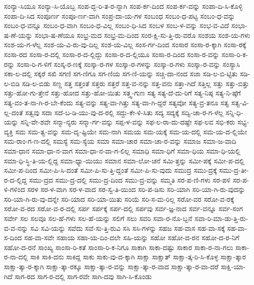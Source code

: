 {ಸಂನ್ಯಾ-ಸಿಯೂ
ಸಂನ್ಯಾ-ಸಿ-ಯೊಬ್ಬ
ಸಂಪ-ದ್ಭ-ರಿ-ತ-ರ-ನ್ನಾಗಿ
ಸಂಪ-ರ್ಕ-ದಿಂದ
ಸಂಪ-ರ್ಕ-ವನ್ನು
ಸಂಪಾ-ದಿ-ಸಿ-ಕೊಳ್ಳಿ
ಸಂಪಾ-ದಿ-ಸಿದ
ಸಂಪೂರ್ಣ
ಸಂಪೂ-ರ್ಣ-ವಾಗಿ
ಸಂಪ್ರ-ದಾ-ಯ-ಗಳ
ಸಂಬಂಧ
ಸಂಬಂ-ಧ-ಪಟ್ಟ
ಸಂಬಂ-ಧ-ವನ್ನು
ಸಂಬಂ-ಧ-ವನ್ನೂ
ಸಂಬಂ-ಧ-ವಾಗಿ
ಸಂಬಂ-ಧ-ವಿಲ್ಲ
ಸಂಬಂ-ಧಿ-ಸಿದ
ಸಂಬಳ
ಸಂಬ-ಳ-ವನ್ನು
ಸಂಭ-ವ-ವಿದೆ
ಸಂಭಾ-ಷ-ಣೆ-ಯನ್ನು
ಸಂಭಾ-ಷ-ಣೆಯೂ
ಸಂಭ್ರ-ಮದ
ಸಂಭ್ರ-ಮ-ದಿಂದ
ಸಂರ-ಕ್ಷಿ-ಸು-ತ್ತಿ-ರು-ವರೊ
ಸಂಶಯ
ಸಂಶ-ಯ-ಗಳು
ಸಂಶ-ಯ-ಗ-ಳೆಲ್ಲ
ಸಂಶ-ಯ-ವಿ-ರು-ವು-ದಿಲ್ಲ
ಸಂಶ-ಯ-ವಿಲ್ಲ
ಸಂಸ-ರ್ಗ-ದಿಂದ
ಸಂಸಾರ
ಸಂಸಾ-ರ-ಕ್ಕಾಗಿ
ಸಂಸಾ-ರಕ್ಕೆ
ಸಂಸಾ-ರದ
ಸಂಸಾ-ರ-ದಲ್ಲಿ
ಸಂಸಾ-ರ-ದ-ಲ್ಲಿದ್ದು
ಸಂಸಾ-ರ-ದ-ಲ್ಲಿಯೂ
ಸಂಸಾ-ರ-ದಿಂದ
ಸಂಸಾ-ರ-ವನ್ನು
ಸಂಸಾ-ರಿ-ಕ-ರನ್ನು
ಸಂಸಾ-ರಿ-ಗ-ಳಿಗೆ
ಸಂಸ್ಕ-ರ-ಣಕ್ಕೆ
ಸಂಸ್ಕಾ-ರ-ಗಳ
ಸಂಸ್ಕಾ-ರ-ಗಳನ್ನು
ಸಂಸ್ಕಾ-ರ-ಗಳು
ಸಂಸ್ಕಾ-ರ-ವನ್ನು
ಸಂಸ್ಯಾಸಿ
ಸಕಾ-ಲ-ದಲ್ಲಿ
ಸಕ್ಕರೆ
ಸಖಿ
ಸಗಣಿ
ಸಗ-ಣಿಗೂ
ಸಗ-ಣಿಯ
ಸಗ-ಣಿ-ಯನ್ನು
ಸಚ್ಚಿ-ದಾ-ನಂದ
ಸಜಾ
ಸಡಿ-ಲ-ಬಿ-ಟ್ಟಿತು
ಸಡಿ-ಲ-ಬಿಡಿ
ಸಡಿ-ಲ-ಬಿಡು
ಸಣ್ಣ
ಸತ್ತ
ಸತ್ತಂತೆ
ಸತ್ತರು
ಸತ್ತರೆ
ಸತ್ತ-ವ-ನನ್ನು
ಸತ್ತ-ವನು
ಸತ್ತಾ-ಗಿದೆ
ಸತ್ತಿಲ್ಲ
ಸತ್ತು
ಸತ್ತು-ಬಿತ್ತು
ಸತ್ತು-ಹೋ-ಗು-ತ್ತೇನೆ
ಸತ್ತು-ಹೋದ
ಸತ್ತು-ಹೋ-ಯಿತು
ಸತ್ತ್ವ-ಗುಣ
ಸತ್ಯ
ಸತ್ಯ-ದೆ-ದು-ರಿಗೆ
ಸತ್ಯ-ನಿಷ್ಠ
ಸತ್ಯ-ನಿ-ಷ್ಠೆಗೆ
ಸತ್ಯ-ವಂ-ತ-ನಾ-ಗಿ-ರ-ಬೇ-ಕೆಂದು
ಸತ್ಯ-ವನ್ನು
ಸತ್ಯ-ವಾ-ಗಿತ್ತು
ಸತ್ಯ-ವಾ-ಗಿ-ದ್ದರೆ
ಸತ್ಯವೋ
ಸತ್ಯ-ವ್ರ-ತನೂ
ಸತ್ವ
ಸತ್ವ-ವಿ-ಲ್ಲ-ದಂತೆ
ಸತ್ವವು
ಸದಾ
ಸದೆ-ಬ-ಡಿ-ಯು-ವು-ದ-ರಲ್ಲಿ
ಸದ್ದು-ಕೇ-ಳಿ-ಸಿತು
ಸದ್ಯ
ಸದ್ಯಕ್ಕೆ
ಸದ್ವಿ-ಚಾ-ರ-ಗ-ಳೆಲ್ಲ
ಸನ್ನಿ-ಧಿ-ಯನ್ನು
ಸನ್ನಿ-ವೇ-ಶವೇ
ಸನ್ಮಾ-ನ್ಯರು
ಸನ್ಮಾ-ರ್ಗ-ವನ್ನು
ಸಪ್ಪ-ಳ-ವನ್ನು
ಸಫ-ಲ-ರಾ-ದು-ದಷ್ಟೇ
ಸಫ-ಲವ
ಸಭಿ-ಕರು
ಸಭ್ಯ-ವ್ಯಕ್ತಿ
ಸಮ
ಸಮ-ತ್ವ-ವನ್ನು
ಸಮ-ದೃ-ಷ್ಟಿಯೇ
ಸಮ-ನಾಗಿ
ಸಮಯ
ಸಮ-ಯಕ್ಕೆ
ಸಮ-ಯ-ದಲ್ಲಿ
ಸಮ-ಯ-ದ-ಲ್ಲಿಯೇ
ಸಮ-ರಾಂ-ಗ-ಣ-ದಲ್ಲಿ
ಸಮಸ್ಯೆ
ಸಮ-ಸ್ಯೆಯ
ಸಮಾ
ಸಮಾ-ಚಾರ
ಸಮಾ-ಚಾ-ರ-ವನ್ನು
ಸಮಾಜ
ಸಮಾ-ಜ-ವಾದಿ
ಸಮಾ-ಧಾನ
ಸಮಾ-ಧಾ-ನ-ವಾಗ
ಸಮಾ-ಧಾ-ನ-ವಾ-ಗ-ಲಿಲ್ಲ
ಸಮಾಧಿ
ಸಮಾ-ಧಿಗೆ
ಸಮಾ-ಧಿಯ
ಸಮಾ-ಧಿ-ಯಲ್ಲಿ
ಸಮಾ-ಧಿ-ಸ್ಥಿ-ತಿ-ಯ-ಲ್ಲಿದ್ದ
ಸಮಾ-ಧ್ಯಾ-ಯಿಯು
ಸಮಾನ
ಸಮಾ-ಲೋ-ಚನೆ
ಸಮಿ-ತ್ತನ್ನು
ಸಮೀ-ಪಕ್ಕೆ
ಸಮೀ-ಪ-ದಲ್ಲಿ
ಸಮೀ-ಪ-ದಿಂದ
ಸಮೀ-ಪಿ-ಸಿ-ದಂತೆ
ಸಮೀ-ಪಿ-ಸು-ತ್ತಿ-ದ್ದಂತೆ
ಸಮೀ-ಪಿ-ಸು-ವುದು
ಸಮುದ್ರ
ಸಮು-ದ್ರಕ್ಕೆ
ಸಮು-ದ್ರ-ತೀ-ರ-ದ-ಲ್ಲಿದ್ದ
ಸಮು-ದ್ರದ
ಸಮು-ದ್ರ-ದಲ್ಲಿ
ಸಮು-ದ್ರ-ದಿಂದ
ಸಮು-ದ್ರ-ವನ್ನು
ಸಮ್ಮತಿ
ಸರ-ಪ-ಣಿ-ಗಳು
ಸರ-ಪಳಿ
ಸರ-ಪ-ಳಿ-ಗಳಿಂದ
ಸರಳ
ಸರ-ಳ-ವಾಗಿ
ಸರ-ಳ-ವಾದ
ಸರ-ಸ್ವ-ತಿ-ಯಿಂದ
ಸರಿ-ಪ-ಡಿಸು
ಸರಿ-ಯಾಗಿ
ಸರಿ-ಯಾ-ಗಿ-ರು-ವುದನ್ನು
ಸರಿ-ಯಾ-ಗಿ-ರು-ವು-ದನ್ನೇ
ಸರಿ-ಯಾದ
ಸರಿ-ಯಾ-ಯಿತು
ಸರಿಯೆ
ಸರಿ-ಸ-ಮ-ರಿಲ್ಲ
ಸರೋ-ವರ
ಸರೋ-ವ-ರಕ್ಕೆ
ಸರೋ-ವ-ರದ
ಸರೋ-ವ-ರ-ದಲ್ಲಿ
ಸರ್ಪ
ಸರ್ಪಕ್ಕೆ
ಸರ್ಪ-ದಲ್ಲಿ
ಸರ್ಪವು
ಸರ್ವ-ಜ್ಞ-ನಾದ
ಸರ್ವ-ವನ್ನೂ
ಸರ್ವ-ಸಂಗ
ಸರ್ವೇ
ಸಲ
ಸಲವೂ
ಸಲ-ಹೆ-ಗಳು
ಸಲ-ಹೆ-ಯನ್ನು
ಸಲಿಗೆ
ಸಲು
ಸವರಿ
ಸವಾ-ರ-ನೊ-ಬ್ಬನೆ
ಸವಾ-ರಿ-ಮಾ-ಡು-ತ್ತಿ-ರು-ವ-ವ-ನನ್ನು
ಸವಿ
ಸವಿ-ಯನ್ನು
ಸವೆದು
ಸವೆ-ಸು-ತ್ತಿ-ರುವಿ
ಸಸಿ
ಸಸಿ-ಗಳನ್ನು
ಸಹಜ
ಸಹ-ವಾಸ
ಸಹ-ವಾ-ಸಕ್ಕೆ
ಸಹ-ವಾ-ಸ-ದಿಂದ
ಸಹ-ವಾ-ಸವೇ
ಸಹಾಯ
ಸಹಾ-ಯ-ದಿಂ-ದಲೇ
ಸಹಿ-ಯನ್ನು
ಸಹೋ
ಸಹೋ-ದ-ರನ
ಸಹೋ-ದ-ರ-ನಿಗೆ
ಸಹೋ-ದ-ರನೆ
ಸಾಂಖ್ಯ
ಸಾಂಸಾ-ರಿ-ಕತೆ
ಸಾಂಸಾ-ರಿ-ಕ-ನಿಗೂ
ಸಾಕಾಗಿ
ಸಾಕಾ-ದಷ್ಟು
ಸಾಕಾರ
ಸಾಕಾ-ರ-ನಾ-ಗಲು
ಸಾಕಾ-ರ-ನಾ-ದಲ್ಲಿ
ಸಾಕಿ
ಸಾಕಿ-ದನು
ಸಾಕಿದ್ದ
ಸಾಕು
ಸಾಕು-ವು-ದ-ಕ್ಕಾಗಿ
ಸಾಕ್ಷಾ
ಸಾಕ್ಷಾತ್
ಸಾಕ್ಷಾ-ತ್ಕ-ರಿ-ಸಿ-ಕೊಳ್ಳ
ಸಾಕ್ಷಾ-ತ್ಕಾರ
ಸಾಕ್ಷಾ-ತ್ಕಾ-ರ-ಕ್ಕಾಗಿ
ಸಾಕ್ಷಾ-ತ್ಕಾ-ರಕ್ಕೂ
ಸಾಕ್ಷಾ-ತ್ಕಾ-ರ-ವನ್ನು
ಸಾಕ್ಷಾ-ತ್ಕಾ-ರ-ವಾದ
ಸಾಕ್ಷಾ-ತ್ಕಾ-ರ-ವಾ-ದರೆ
ಸಾಕ್ಷಿ-ಯಾ-ಗಿದೆ
ಸಾಗ-ರದ
ಸಾಗ-ರ-ದಲ್ಲಿ
ಸಾಗ-ರವೇ
ಸಾಗಿ-ದವು
ಸಾಗಿ-ಸಿ-ಕೊಂಡು
}
